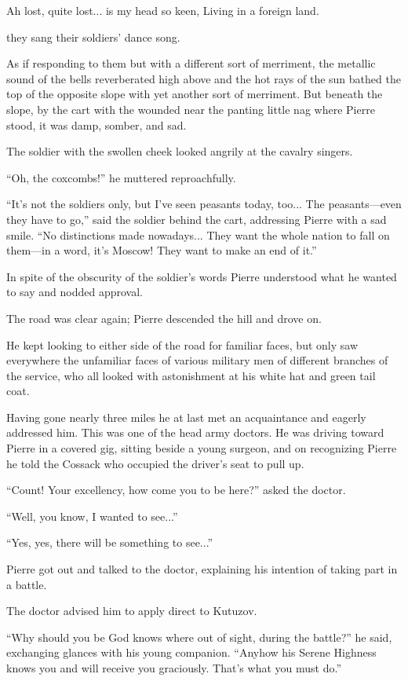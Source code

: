 Ah lost, quite lost... is my head so keen, Living in a foreign
land.

they sang their soldiers' dance song.

As if responding to them but with a different sort of merriment,
the metallic sound of the bells reverberated high above and the
hot rays of the sun bathed the top of the opposite slope with yet
another sort of merriment. But beneath the slope, by the cart
with the wounded near the panting little nag where Pierre stood,
it was damp, somber, and sad.

The soldier with the swollen cheek looked angrily at the cavalry
singers.

``Oh, the coxcombs!'' he muttered reproachfully.

``It's not the soldiers only, but I've seen peasants today,
too... The peasants---even they have to go,'' said the soldier
behind the cart, addressing Pierre with a sad smile. ``No
distinctions made nowadays...  They want the whole nation to fall
on them---in a word, it's Moscow! They want to make an end of
it.''

In spite of the obscurity of the soldier's words Pierre
understood what he wanted to say and nodded approval.

The road was clear again; Pierre descended the hill and drove on.

He kept looking to either side of the road for familiar faces,
but only saw everywhere the unfamiliar faces of various military
men of different branches of the service, who all looked with
astonishment at his white hat and green tail coat.

Having gone nearly three miles he at last met an acquaintance and
eagerly addressed him. This was one of the head army doctors. He
was driving toward Pierre in a covered gig, sitting beside a
young surgeon, and on recognizing Pierre he told the Cossack who
occupied the driver's seat to pull up.

``Count! Your excellency, how come you to be here?'' asked the
doctor.

``Well, you know, I wanted to see...''

``Yes, yes, there will be something to see...''

Pierre got out and talked to the doctor, explaining his intention
of taking part in a battle.

The doctor advised him to apply direct to Kutuzov.

``Why should you be God knows where out of sight, during the
battle?'' he said, exchanging glances with his young
companion. ``Anyhow his Serene Highness knows you and will
receive you graciously. That's what you must do.''


